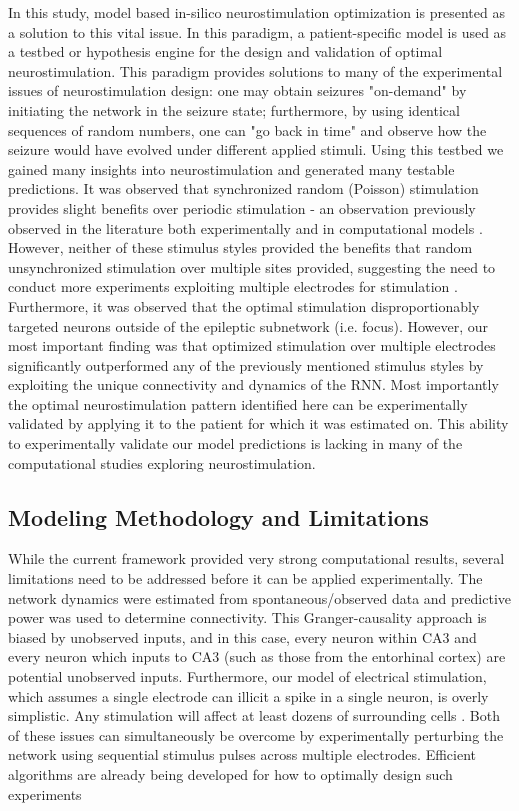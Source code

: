 \documentclass[11pt,a4paper,final]{article}
\begin{document}
In this study, model based in-silico neurostimulation optimization is presented as a solution to this vital issue.
In this paradigm, a patient-specific model is used as a testbed or hypothesis engine for the design and validation of optimal neurostimulation.
This paradigm provides solutions to many of the experimental issues of neurostimulation design: one may obtain seizures "on-demand" by initiating the network in the seizure state; furthermore, by using identical sequences of random numbers, one can "go back in time" and observe how the seizure would have evolved under different applied stimuli.
Using this testbed we gained many insights into neurostimulation and generated many testable predictions.
It was observed that synchronized random (Poisson) stimulation provides slight benefits over periodic stimulation - an observation previously observed in the literature both experimentally and in computational models \citep{wyckhuys10,buffel14}.
However, neither of these stimulus styles provided the benefits that random unsynchronized stimulation over multiple sites provided, suggesting the need to conduct more experiments exploiting multiple electrodes for stimulation \citep{cook13,van14}.
Furthermore, it was observed that the optimal stimulation disproportionably targeted neurons outside of the epileptic subnetwork (i.e. focus).
However, our most important finding was that optimized stimulation over multiple electrodes significantly outperformed any of the previously mentioned stimulus styles by exploiting the unique connectivity and dynamics of the RNN.
Most importantly the optimal neurostimulation pattern identified here can be experimentally validated by applying it to the patient for which it was estimated on.
This ability to experimentally validate our model predictions is lacking in many of the computational studies exploring neurostimulation.

\subsection{Modeling Methodology and Limitations}

While the current framework provided very strong computational results, several limitations need to be addressed before it can be applied experimentally.
The network dynamics were estimated from spontaneous/observed data and predictive power was used to determine connectivity.
This Granger-causality approach is biased by unobserved inputs, and in this case, every neuron within CA3 and every neuron which inputs to CA3 (such as those from the entorhinal cortex) are potential unobserved inputs.
Furthermore, our model of electrical stimulation, which assumes a single electrode can illicit a spike in a single neuron, is overly simplistic.
Any stimulation will affect at least dozens of surrounding cells \citep{grill05,desai14}.
Both of these issues can simultaneously be overcome by experimentally perturbing the network using sequential stimulus pulses across multiple electrodes.
Efficient algorithms are already being developed for how to optimally design such experiments \citep{lepage13,kim14}
\end{document}
